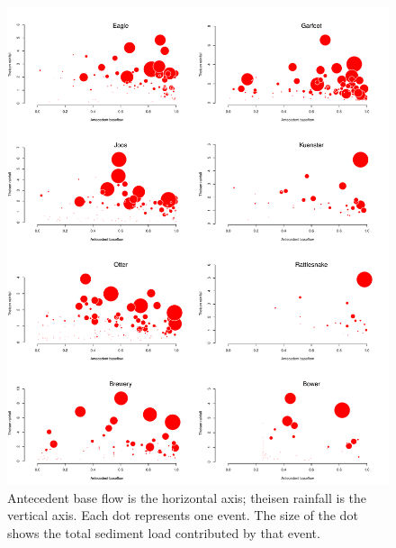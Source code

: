 \documentclass[10pt]{article}
\begin{document}
\begin{figure}
    \begin{center}
\includegraphics{loadings-figure4}
    \end{center}
    \caption{Antecedent base flow is the horizontal axis; theisen rainfall is the vertical axis. Each dot represents one event. The size of the dot shows the total sediment load contributed by that event. \label{bubbles}}
\end{figure}




\end{document}
